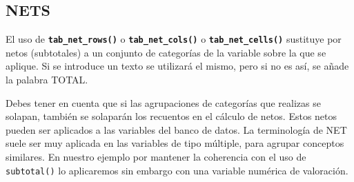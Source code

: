 \documentclass[
]{book}
\begin{document}
\hypertarget{nets}{%
\subsection{NETS}\label{nets}}

El uso de \textbf{\texttt{tab\_net\_rows()}} o \textbf{\texttt{tab\_net\_cols()}} o \textbf{\texttt{tab\_net\_cells()}} sustituye por netos (subtotales) a un conjunto de categorías de la variable sobre la que se aplique. Si se introduce un texto se utilizará el mismo, pero si no es así, se añade la palabra TOTAL.

Debes tener en cuenta que si las agrupaciones de categorías que realizas se solapan, también se solaparán los recuentos en el cálculo de netos. Estos netos pueden ser aplicados a las variables del banco de datos. La terminología de NET suele ser muy aplicada en las variables de tipo múltiple, para agrupar conceptos similares. En nuestro ejemplo por mantener la coherencia con el uso de \texttt{subtotal()} lo aplicaremos sin embargo con una variable numérica de valoración.
\end{document}
